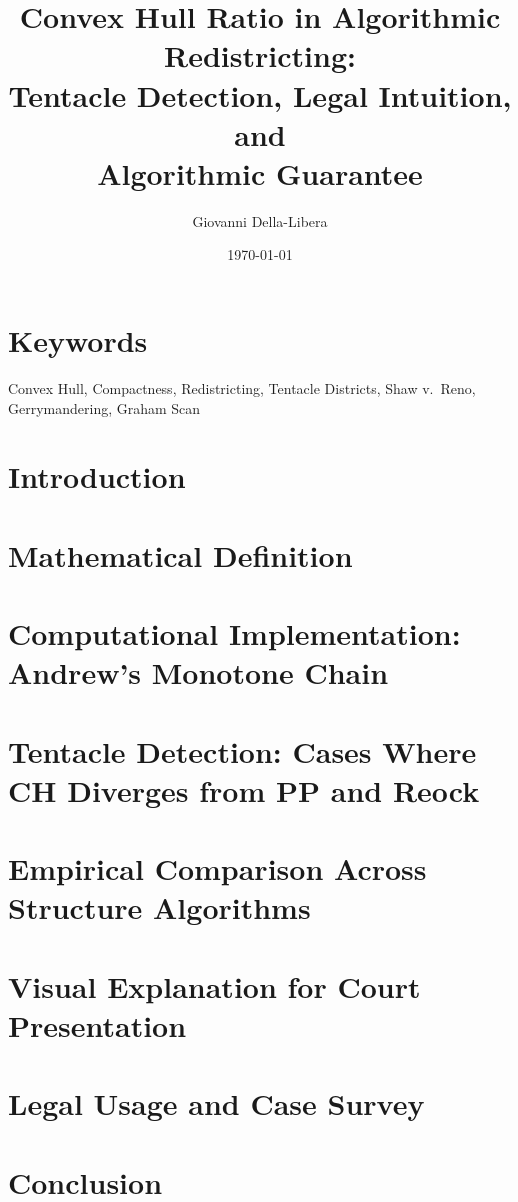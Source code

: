 \documentclass[12pt]{article}
\title{\textbf{Convex Hull Ratio in Algorithmic Redistricting:\\
Tentacle Detection, Legal Intuition, and\\
Algorithmic Guarantee}}
\author{Giovanni Della-Libera}
\date{\today}
\begin{document}
\maketitle

\begin{abstract}

\end{abstract}

\section*{Keywords}
Convex Hull, Compactness, Redistricting, Tentacle Districts, Shaw v.\ Reno,
Gerrymandering, Graham Scan

\section{Introduction}


\section{Mathematical Definition}


\section{Computational Implementation: Andrew's Monotone Chain}


\section{Tentacle Detection: Cases Where CH Diverges from PP and Reock}


\section{Empirical Comparison Across Structure Algorithms}


\section{Visual Explanation for Court Presentation}


\section{Legal Usage and Case Survey}


\section{Conclusion}




\end{document}
